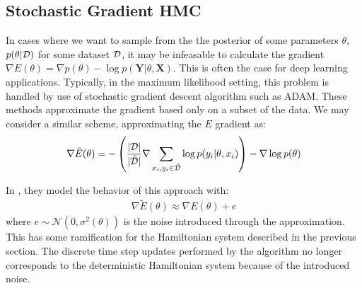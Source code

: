 

    
\subsection{Stochastic Gradient HMC}

In cases where we want to sample from the the posterior of some parameters $\theta$,  $p(\theta | \mathcal{D})$ for some dataset $\mathcal{D}$, it may be infeasable to calculate the gradient $\nabla E(\theta) = \nabla p(\theta) - \log{p(\bm{Y} | \theta, \bm{X})}$. 
This is often the case for deep learning applications.
Typically, in the maximum likelihood setting, this problem is handled by use of stochastic gradient descent algorithm such as ADAM. 
These methods approximate the gradient based only on a subset of the data. 
We may consider a similar scheme, approximating the $E$ gradient as:
\begin{align*}
    \nabla\tilde{E}(\theta) = -\left(\frac{|\mathcal{D}|}{|\tilde{\mathcal{D}}|}  \nabla \sum_{x_i, y_i\in \tilde{\mathcal{D}}} \log{p(y_i |\theta, x_i)}\right)  -\nabla \log{p(\theta)}
\end{align*}

In \cite{chen_stochastic_2014}, they model the behavior of this approach with:
\begin{align} \label{eq:sghmc-model}
    \nabla\tilde{E}(\theta) \approx \nabla{E}(\theta) + e
\end{align}
where $e \sim \mathcal{N}(0, \sigma^2(\theta))$ is the noise introduced through the approximation. This has some ramification for the Hamiltonian system described in the previous section. 
The discrete time step updates performed by the algorithm no longer corresponds to the deterministic Hamiltonian system because of the introduced noise. 

